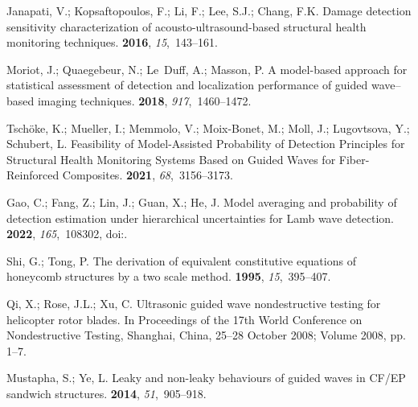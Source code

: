 \documentclass[sensors,article,accept,moreauthors,pdftex]{Definitions/mdpi}
\begin{document}
\begin{thebibliography}{999}
Janapati, V.; Kopsaftopoulos, F.; Li, F.; Lee, S.J.; Chang, F.K.
\newblock Damage detection sensitivity characterization of
  acousto-ultrasound-based structural health monitoring techniques.
 {\bf 2016}, {\em 15},~143--161.

Moriot, J.; Quaegebeur, N.; Le~Duff, A.; Masson, P.
\newblock A model-based approach for statistical assessment of detection and
  localization performance of guided wave–based imaging techniques.
 {\bf 2018}, {\em 917},~1460--1472.

Tsch\"oke, K.; Mueller, I.; Memmolo, V.; Moix-Bonet, M.; Moll, J.; Lugovtsova,
  Y.; Schubert, L.
\newblock Feasibility of Model-Assisted Probability of Detection Principles for
  Structural Health Monitoring Systems Based on Guided Waves for
  Fiber-Reinforced Composites.
 {\bf 2021}, {\em
  68},~3156--3173.

Gao, C.; Fang, Z.; Lin, J.; Guan, X.; He, J.
\newblock Model averaging and probability of detection estimation under
  hierarchical uncertainties for Lamb wave detection.
 {\bf 2022}, {\em 165},~108302,
\newblock
  doi:{\href{https://doi.org/10.1016/j.ymssp.2021.108302}{}}.

Shi, G.; Tong, P.
\newblock The derivation of equivalent constitutive equations of honeycomb
  structures by a two scale method.
 {\bf 1995}, {\em 15},~395--407.

Qi, X.; Rose, J.L.; Xu, C.
\newblock Ultrasonic guided wave nondestructive testing for helicopter rotor
  blades.
\newblock  In Proceedings of the 17th World Conference on Nondestructive Testing, Shanghai, China, 
25--28 October 2008; Volume 2008, pp. 1--7.%

Mustapha, S.; Ye, L.
\newblock Leaky and non-leaky behaviours of guided waves in CF/EP sandwich
  structures.
 {\bf 2014}, {\em 51},~905--918.


\end{thebibliography}
\end{document}
